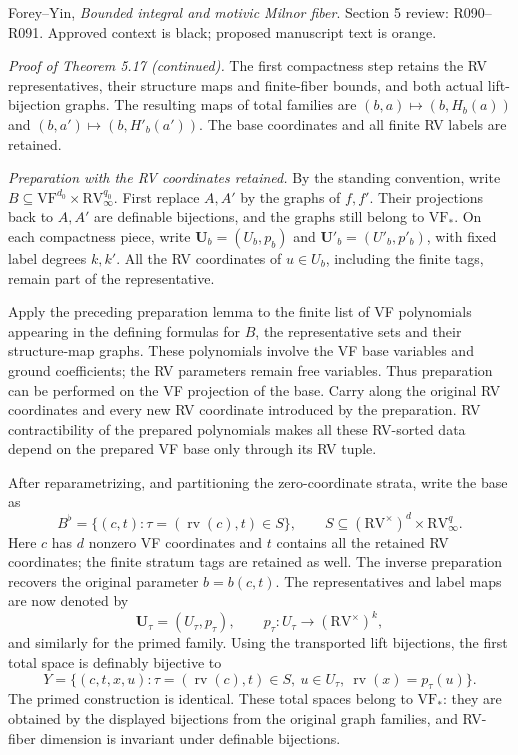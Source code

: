 \documentclass[12pt]{amsart}
\theoremstyle{remark}
\theoremstyle{definition}
\newcommand{\rv}{\operatorname{rv}}
\newcommand{\RV}{\mathrm{RV}}
\newcommand{\VF}{\mathrm{VF}}
\numberwithin{equation}{section}
\theoremstyle{plain}
\begin{document}
\setcounter{section}{5}
\setcounter{subsection}{2}
\setcounter{thm}{18}
{\small\noindent Forey--Yin, \emph{Bounded integral and motivic Milnor fiber}.
Section 5 review: R090--R091.
Approved context is black; proposed manuscript text is orange.}
\medskip

\noindent\emph{Proof of Theorem 5.17 (continued).}
The first compactness step retains the RV representatives,
their structure maps and finite-fiber bounds, and both actual
lift-bijection graphs.
The resulting maps of total families are
$(b,a)\mapsto(b,H_b(a))$ and $(b,a')\mapsto(b,H'_b(a'))$.
The base coordinates and all finite RV labels are retained.

{\color{ProposalOrange}
\medskip
\noindent\emph{Preparation with the RV coordinates retained.}
By the standing convention, write
$B\subseteq\VF^{d_0}\times\RV_\infty^{q_0}$.
First replace $A,A'$ by the graphs of $f,f'$.
Their projections back to $A,A'$ are definable bijections,
and the graphs still belong to $\VF_*$.
On each compactness piece, write
$\bm U_b=(U_b,p_b)$ and $\bm U'_b=(U'_b,p'_b)$,
with fixed label degrees $k,k'$.
All the RV coordinates of $u\in U_b$, including the finite
tags, remain part of the representative.

Apply the preceding preparation lemma to the finite list of
VF polynomials appearing in the defining formulas for $B$,
the representative sets and their structure-map graphs.
These polynomials involve the VF base variables and ground
coefficients; the RV parameters remain free variables.
Thus preparation can be performed on the VF projection of
the base. Carry along the original RV coordinates and every
new RV coordinate introduced by the preparation.
RV contractibility of the prepared polynomials makes all
these RV-sorted data depend on the prepared VF base only
through its RV tuple.

After reparametrizing, and partitioning the zero-coordinate
strata, write the base as
\[
 B^\flat=\{(c,t):\tau=(\rv(c),t)\in S\},\qquad
 S\subseteq(\RV^\times)^d\times\RV_\infty^q.
\]
Here $c$ has $d$ nonzero VF coordinates and $t$ contains
all the retained RV coordinates; the finite stratum tags
are retained as well.
The inverse preparation recovers the original parameter
$b=b(c,t)$.
The representatives and label maps are now denoted by
\[
 \bm U_\tau=(U_\tau,p_\tau),\qquad
 p_\tau:U_\tau\longrightarrow(\RV^\times)^k,
\]
and similarly for the primed family.
Using the transported lift bijections, the first total space
is definably bijective to
\[
 Y=\{(c,t,x,u):
       \tau=(\rv(c),t)\in S,\ u\in U_\tau,\
       \rv(x)=p_\tau(u)\}.
\]
The primed construction is identical.
These total spaces belong to $\VF_*$: they are obtained by
the displayed bijections from the original graph families,
and RV-fiber dimension is invariant under definable
bijections.

}
\end{document}
